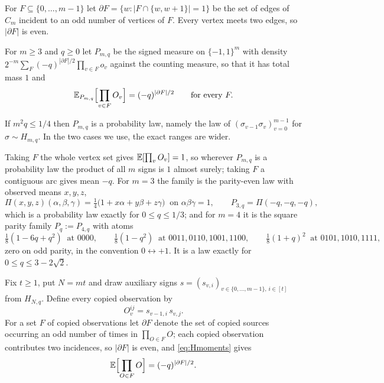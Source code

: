 For $F\subseteq\{0,\dots,m-1\}$ let $\partial F=\{w:|F\cap\{w,w+1\}|=1\}$ be the set of edges of $C_m$ incident to an odd number of vertices of $F$. Every vertex meets two edges, so $|\partial F|$ is even.

\begin{definition}\label{def:cycletarget}
For $m\ge3$ and $q\ge0$ let $P_{m,q}$ be the signed measure on $\{-1,1\}^m$ with density $2^{-m}\sum_F(-q)^{|\partial F|/2}\prod_{v\in F}o_v$ against the counting measure, so that it has total mass $1$ and
\begin{equation}\label{eq:cycletarget}
\mathbb E_{P_{m,q}}\Bigl[\prod_{v\in F}O_v\Bigr]=(-q)^{|\partial F|/2}\qquad\text{for every }F .
\end{equation}
\end{definition}

If $m^2q\le1/4$ then $P_{m,q}$ is a probability law, namely the law of $(\sigma_{v-1}\sigma_v)_{v=0}^{m-1}$ for $\sigma\sim H_{m,q}$. In the two cases we use, the exact ranges are wider.

Taking $F$ the whole vertex set gives $\mathbb E[\prod_vO_v]=1$, so wherever $P_{m,q}$ is a probability law the product of all $m$ signs is $1$ almost surely; taking $F$ a contiguous arc gives mean $-q$. For $m=3$ the family is the parity-even law with observed means $x,y,z$,
\begin{equation}\label{eq:paritylaw}
\Pi(x,y,z)(\alpha,\beta,\gamma)=\tfrac14\bigl(1+x\alpha+y\beta+z\gamma\bigr)\ \text{ on }\alpha\beta\gamma=1,\qquad P_{3,q}=\Pi(-q,-q,-q),
\end{equation}
which is a probability law exactly for $0\le q\le1/3$; and for $m=4$ it is the square parity family $P_q:=P_{4,q}$ with atoms
\begin{equation}\label{eq:squaretarget}
\tfrac18(1-6q+q^2)\ \text{ at }0000,\qquad
\tfrac18(1-q^2)\ \text{ at }0011,0110,1001,1100,\qquad
\tfrac18(1+q)^2\ \text{ at }0101,1010,1111,
\end{equation}
zero on odd parity, in the convention $0\leftrightarrow+1$. It is a law exactly for $0\le q\le3-2\sqrt2$.

Fix $t\ge1$, put $N=mt$ and draw auxiliary signs $s=(s_{v,i})_{v\in\{0,\dots,m-1\},\,i\in[t]}$ from $H_{N,q}$. Define every copied observation by
\begin{equation}\label{eq:cyclewitness}
O_v^{ij}=s_{v-1,i}\,s_{v,j}.
\end{equation}
For a set $F$ of copied observations let $\partial F$ denote the set of copied sources occurring an odd number of times in $\prod_{O\in F}O$; each copied observation contributes two incidences, so $|\partial F|$ is even, and \eqref{eq:Hmoments} gives
\begin{equation}\label{eq:masterchar}
\mathbb E\Bigl[\prod_{O\in F}O\Bigr]=(-q)^{|\partial F|/2}.
\end{equation}

